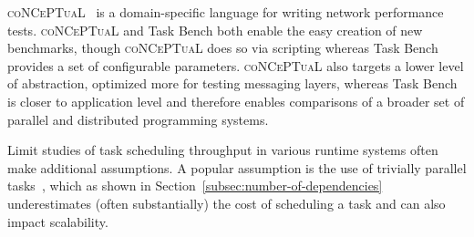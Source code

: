 \textsc{coNCePTuaL}~\cite{Conceptual07} is a domain-specific language
for writing network performance tests. \textsc{coNCePTuaL} and Task
Bench both enable the easy creation of new benchmarks, though
\textsc{coNCePTuaL} does so via scripting whereas Task Bench provides
a set of configurable parameters. \textsc{coNCePTuaL} also targets a
lower level of abstraction, optimized more for testing messaging
layers, whereas Task Bench is closer to application level and
therefore enables comparisons of a broader set of parallel and
distributed programming systems.

Limit studies of task scheduling throughput in various runtime systems
often make additional assumptions. A popular assumption is the use of
trivially parallel tasks~\cite{Canary16, Armstrong14}, which as shown
in Section~\ref{subsec:number-of-dependencies} underestimates (often
substantially) the cost of scheduling a task and can also impact scalability.
